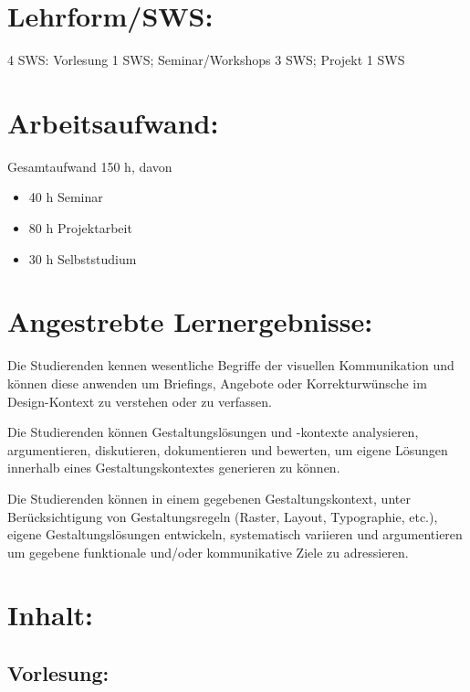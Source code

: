 \section*{Lehrform/SWS:}\label{lehrformsws-21}

4 SWS: Vorlesung 1 SWS; Seminar/Workshops 3 SWS; Projekt 1 SWS

\section*{Arbeitsaufwand:}\label{arbeitsaufwand-20}

Gesamtaufwand 150 h, davon

\begin{itemize}
\item
  40 h Seminar
\item
  80 h Projektarbeit
\item
  30 h Selbststudium
\end{itemize}

\section*{Angestrebte
Lernergebnisse:}\label{angestrebte-lernergebnisse-21}

Die Studierenden kennen wesentliche Begriffe der visuellen Kommunikation
und können diese anwenden um Briefings, Angebote oder Korrekturwünsche
im Design-Kontext zu verstehen oder zu verfassen.

Die Studierenden können Gestaltungslösungen und -kontexte analysieren,
argumentieren, diskutieren, dokumentieren und bewerten, um eigene
Lösungen innerhalb eines Gestaltungskontextes generieren zu können.

Die Studierenden können in einem gegebenen Gestaltungskontext, unter
Berücksichtigung von Gestaltungsregeln (Raster, Layout, Typographie,
etc.), eigene Gestaltungslösungen entwickeln, systematisch variieren und
argumentieren um gegebene funktionale und/oder kommunikative Ziele zu
adressieren.

\section*{Inhalt:}\label{inhalt-21}

\subsection*{Vorlesung:}\label{vorlesung}

